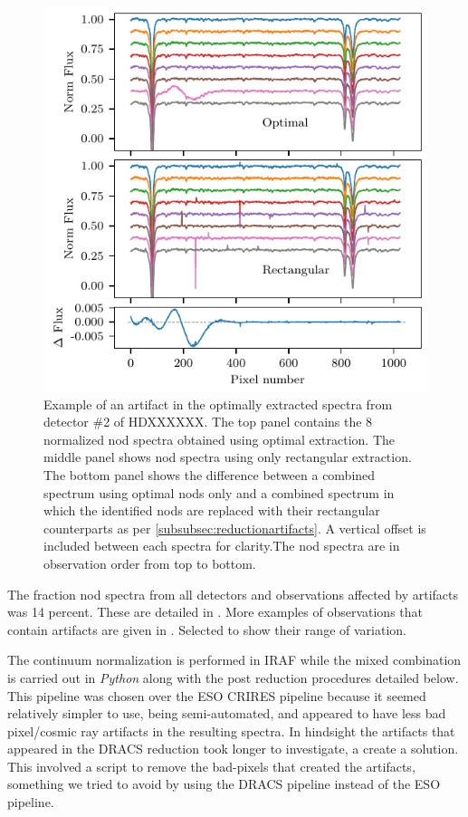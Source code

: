 \begin{figure}
    \centering
    \includegraphics[width=\hsize/2]{figures/reduction/Bad_pixel_replacement}
    \caption{Example of an artifact in the optimally extracted spectra from detector \#2 of HDXXXXXX. The top panel contains the 8 normalized nod spectra obtained using optimal extraction. The middle panel shows nod spectra using only rectangular extraction. The bottom panel shows the difference between a combined spectrum using optimal nods only and a combined spectrum in which the identified nods are replaced with their rectangular counterparts as per \ref{subsubsec:reductionartifacts}. A vertical offset is included between each spectra for clarity.The nod spectra are in observation order from top to bottom.}
    \label{fig:badpixelreplacement}
\end{figure}

The fraction nod spectra from all detectors and observations affected by artifacts was 14 percent. These are detailed in . More examples of observations that contain artifacts are given in . Selected to show their range of variation. 


The continuum normalization is performed in IRAF while the mixed combination is carried out in \emph{Python} along with the post reduction procedures detailed below. This pipeline was chosen over the ESO CRIRES pipeline because it seemed relatively simpler to use, being semi-automated, and appeared to have less bad pixel/cosmic ray artifacts in the resulting spectra. In hindsight the artifacts that appeared in the DRACS reduction took longer to investigate, a create a solution. This involved a script to remove the bad-pixels that created the artifacts, something we tried to avoid by using the DRACS pipeline instead of the ESO pipeline.

